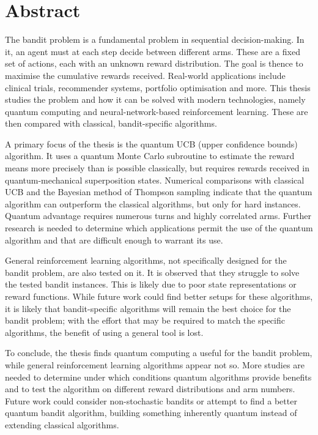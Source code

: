 \chapter{Abstract}

The bandit problem is a fundamental problem in sequential decision-making.
In it, an agent must at each step decide between different arms.
These are a fixed set of actions, each with an unknown reward distribution.
The goal is thence to maximise the cumulative rewards received.
Real-world applications include clinical trials, recommender systems, portfolio optimisation and more.
This thesis studies the problem and how it can be solved with modern technologies, namely quantum computing and neural-network-based reinforcement learning.
These are then compared with classical, bandit-specific algorithms.

A primary focus of the thesis is the quantum UCB (upper confidence bounds) algorithm.
It uses a quantum Monte Carlo subroutine to estimate the reward means more precisely than is possible classically, but requires rewards received in quantum-mechanical superposition states.
Numerical comparisons with classical UCB and the Bayesian method of Thompson sampling indicate that the quantum algorithm can outperform the classical algorithms, but only for hard instances.
Quantum advantage requires numerous turns and highly correlated arms.
Further research is needed to determine which applications permit the use of the quantum algorithm and that are difficult enough to warrant its use.

General reinforcement learning algorithms, not specifically designed for the bandit problem, are also tested on it.
It is observed that they struggle to solve the tested bandit instances.
This is likely due to poor state representations or reward functions.
While future work could find better setups for these algorithms, it is likely that bandit-specific algorithms will remain the best choice for the bandit problem; with the effort that may be required to match the specific algorithms, the benefit of using a general tool is lost.

To conclude, the thesis finds quantum computing a useful for the bandit problem, while general reinforcement learning algorithms appear not so.
More studies are needed to determine under which conditions quantum algorithms provide benefits and to test the algorithm on different reward distributions and arm numbers.
Future work could consider non-stochastic bandits or attempt to find a better quantum bandit algorithm, building something inherently quantum instead of extending classical algorithms.

\cleardoublepage